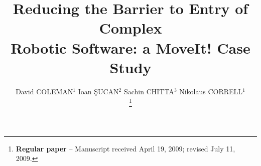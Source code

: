 \documentclass[10pt,journal,compsoc]{joser1}
\begin{document}
\title{Reducing the Barrier to Entry of Complex \\\baselineskip
Robotic Software: a MoveIt! Case Study}

\author{
David COLEMAN$^{1}$
\qquad
Ioan \c{S}UCAN$^{2}$
\qquad
Sachin CHITTA$^{3}$
\qquad
Nikolaus CORRELL$^{1}$

\thanks{{\bf Regular paper} -- Manuscript received April 19, 2009;
revised July 11, 2009.}



} %

\address{
$^1$ Dept. of Computer Science, University of Colorado at Boulder, 430 UCB,
Boulder, CO 80309\\
$^2$ Willow Garage, Inc., 68 Willow Road, Menlo Park, CA 94025\\
$^3$ SRI International, 333 Ravenswood Avenue, Menlo Park, CA 94025
}


\markboth
\end{document}
